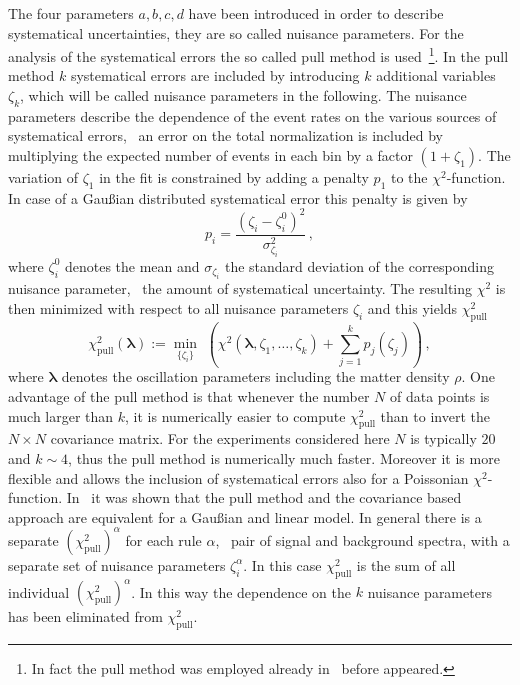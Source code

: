 The four parameters $a,b,c,d$ have been introduced in order to describe
systematical uncertainties, they are so called nuisance parameters.
For the analysis of the systematical errors the so called 
 pull method is 
used~\cite{Fogli:2002pt}\footnote{In fact the pull method
was employed already in~\cite{Huber:2002mx} before 
\cite{Fogli:2002pt} appeared.}. 
In the  pull method $k$ systematical errors are included by introducing 
$k$ additional variables $\zeta_k$, which will  be called 
nuisance parameters in the following. 
The nuisance parameters describe the dependence of the event rates on the 
various sources of systematical errors, \eg\ an error on the total 
normalization is included by multiplying the expected number of events in 
each bin by a factor $(1+\zeta_1)$. The variation of $\zeta_1$ in the fit 
is constrained by adding a penalty $p_1$ to the $\chi^2$-function. In case 
of a  Gau\ss ian distributed systematical error this penalty is 
given by
\begin{equation}
\label{eq:penalty}
p_i=\frac{(\zeta_i-\zeta_i^0)^2}{\sigma_{\zeta_i}^2}\,,
\end{equation}
where $\zeta_i^0$ denotes the mean and $\sigma_{\zeta_i}$ the standard 
deviation of the corresponding nuisance parameter, \ie\ the amount of 
systematical uncertainty. 
The resulting $\chi^2$ is then minimized with respect to all nuisance 
parameters $\zeta_i$ and this yields $\chi^2_\mathrm{pull}$
\begin{equation}
\chi^2_\mathrm{pull}(\boldsymbol{\lambda}):=\min_{\{\zeta_i\} } \,\, \left( 
\chi^2(\boldsymbol{\lambda},
\zeta_1, \ldots, \zeta_k)+ \sum_{j=1}^{k} p_j(\zeta_j)\right)\,,
\end{equation}
where $\boldsymbol{\lambda}$ denotes the oscillation parameters 
including the matter density
$\rho$. One advantage of the pull method is that whenever the number $N$ of 
data points is much larger than $k$, it is numerically easier to compute 
$\chi^2_\mathrm{pull}$ than to invert the $N\times N$ covariance matrix. For
the experiments considered here $N$ is typically $20$ and $k\sim 4$, thus
the pull method is numerically much faster. Moreover it is more flexible and 
allows the inclusion of systematical errors also for a 
Poissonian $\chi^2$-function.
In~\cite{Fogli:2002pt} it was shown that the pull method and the covariance
based approach are equivalent for a Gau\ss ian and linear model. In general
there is a separate $(\chi^2_\mathrm{pull})^\alpha$ for each rule $\alpha$, 
\ie\ pair of signal and background spectra, with a separate set of 
nuisance parameters $\zeta_i^\alpha$. In this case $\chi^2_\mathrm{pull}$
is the sum of all individual  $(\chi^2_\mathrm{pull})^\alpha$.
In this way the dependence on the $k$ nuisance parameters has been eliminated 
from $\chi^2_\mathrm{pull}$. 

